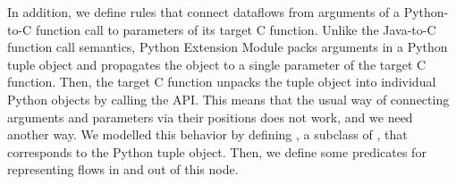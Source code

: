 
In addition, we define rules that connect dataflows from arguments of
a Python-to-C function call to parameters of its target C function.
Unlike the Java-to-C function call semantics, Python Extension Module
packs arguments in a Python tuple object and propagates the object to a single
parameter of the target C function. 
Then, the target C function unpacks the tuple object into individual Python
objects by calling the  API. 
This means that the usual way of connecting arguments and parameters via their
positions does not work, and we need another way.
We modelled this behavior by defining , a subclass of ,
that corresponds to the Python tuple object. Then, we define some predicates
for representing flows in and out of this node. 



\medskip

